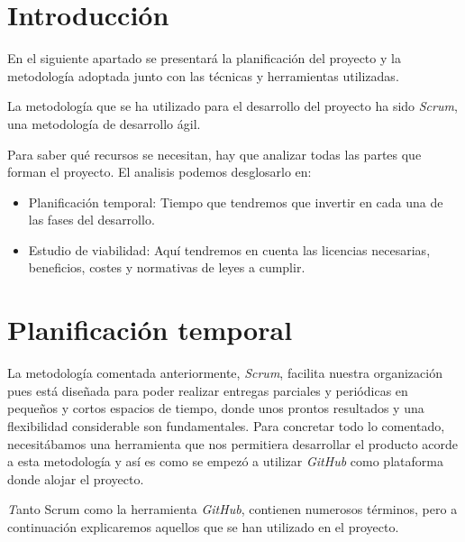 
\section{Introducción}

En el siguiente apartado se presentará la planificación del proyecto y la metodología adoptada junto con las técnicas y herramientas utilizadas.

La metodología que se ha utilizado para el desarrollo del proyecto ha sido \textit{Scrum}, una metodología de desarrollo ágil.

Para saber qué recursos se necesitan, hay que analizar todas las partes que forman el proyecto. El analisis podemos desglosarlo en:

\begin{itemize}
	\item Planificación temporal: Tiempo que tendremos que invertir en cada una de las fases del desarrollo.
	\item Estudio de viabilidad: Aquí tendremos en cuenta las licencias necesarias, beneficios, costes y normativas de leyes a cumplir.
\end{itemize}


\section{Planificación temporal}

La metodología comentada anteriormente, \textit{Scrum}, facilita nuestra organización pues está diseñada para poder realizar entregas parciales y periódicas en pequeños y cortos espacios de tiempo, donde unos prontos resultados y una flexibilidad considerable son fundamentales. Para concretar todo lo comentado, necesitábamos una herramienta que nos permitiera desarrollar el producto acorde a esta metodología y así es como se empezó a utilizar \textit{GitHub} como plataforma donde alojar el proyecto. 

\textit Tanto {Scrum} como la herramienta \textit{GitHub}, contienen numerosos términos, pero a continuación explicaremos aquellos que se han utilizado en el proyecto.

